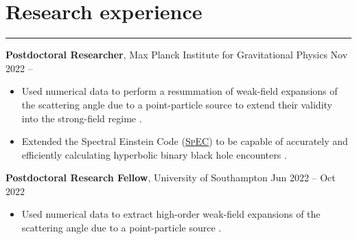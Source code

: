 \documentclass[10.5pt, oneside]{article}   	%
\begin{document}
 
 
\begin{center}
\huge
\href{mailto:oliver.long@aei.mpg.de}{} \:
\textcolor{Orcidcolour}{\href{https://orcid.org/0000-0002-3897-9272}{}} \:
\textcolor{RGcolour}{\href{https://www.researchgate.net/profile/Oliver-Long-3}{}} \:
\textcolor{LIcolour}{\href{https://www.linkedin.com/in/oliverflong/}{}} \:
\href{https://scholar.google.com/citations?user=92pSUO0AAAAJ&hl=en}{} \:
\href{https://oliverlong.info}{}
\end{center}

 \vspace{1mm}


{\color{Sectioncolour}
\section*{Research experience} 
\vspace{-3mm}
\noindent\rule{\linewidth}{0.6pt}}

\textbf{Postdoctoral Researcher}, Max Planck Institute for Gravitational Physics \hfill Nov 2022 --\\ \vspace{-5mm}
\begin{itemize}
\item Used numerical data to perform a resummation of weak-field expansions of the scattering angle due to a point-particle source to extend their validity into the strong-field regime \cite{Long:2024ltn}.
\item Extended the Spectral Einstein Code (\href{https://www.black-holes.org/for-researchers/spec}{\textsc{SpEC}}) to be capable of accurately and efficiently calculating hyperbolic binary black hole encounters \cite{Mendes:2025gov,Long:2025nmj,Scheel:2025jct}.
\end{itemize}

\textbf{Postdoctoral Research Fellow}, University of Southampton \hfill Jun 2022 -- Oct 2022\\ 
\vspace{-5mm}
\begin{itemize}
\item Used numerical data to extract high-order weak-field expansions of the scattering angle due to a point-particle source \cite{Barack:2023oqp}.
\end{itemize}
\end{document}
